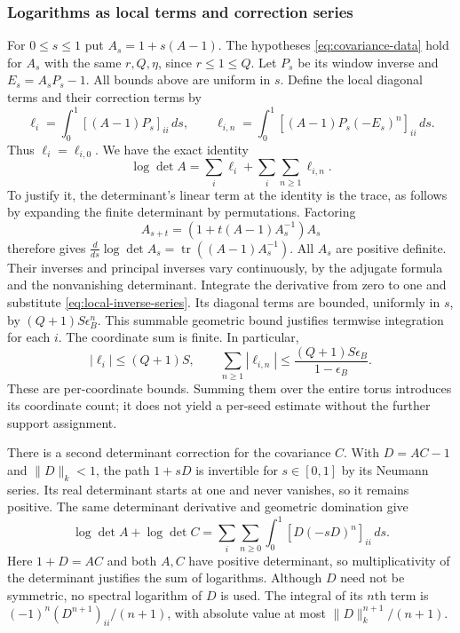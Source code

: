 \subsubsection{Logarithms as local terms and correction series}
For $0\le s\le1$ put $A_s=1+s(A-1)$. The hypotheses
\eqref{eq:covariance-data} hold for $A_s$ with the same
$r,Q,\eta$, since $r\le1\le Q$. Let $P_s$ be its window
inverse and $E_s=A_sP_s-1$. All bounds above are uniform in $s$.
Define the local diagonal terms and their correction terms by
\[
 \ell_i=\int_0^1[(A-1)P_s]_{ii}\,ds,
 \qquad
 \ell_{i,n}=\int_0^1[(A-1)P_s(-E_s)^n]_{ii}\,ds.
\]
Thus $\ell_i=\ell_{i,0}$. We have the exact identity
\begin{equation}\label{eq:local-logdet}
 \log\det A=\sum_i\ell_i+
                   \sum_i\sum_{n\ge1}\ell_{i,n}.
\end{equation}
To justify it, the determinant's linear term at the identity is
the trace, as follows by expanding the finite determinant by
permutations. Factoring
\[
 A_{s+t}=(1+t(A-1)A_s^{-1})A_s
\]
therefore gives
$\frac{d}{ds}\log\det A_s=
\operatorname{tr}((A-1)A_s^{-1})$.
All $A_s$ are positive definite. Their inverses and principal
inverses vary continuously, by the adjugate formula and the
nonvanishing determinant. Integrate the derivative from zero to
one and substitute \eqref{eq:local-inverse-series}. Its diagonal
terms are bounded, uniformly in $s$, by
$(Q+1)S\epsilon_B^n$. This summable geometric bound justifies
termwise integration for each $i$. The coordinate sum is finite.
In particular,
\[
 |\ell_i|\le(Q+1)S,\qquad
 \sum_{n\ge1}|\ell_{i,n}|
 \le\frac{(Q+1)S\epsilon_B}{1-\epsilon_B}.
\]
These are per-coordinate bounds. Summing them over the entire
torus introduces its coordinate count; it does not yield a
per-seed estimate without the further support assignment.

There is a second determinant correction for the covariance $C$.
With $D=AC-1$ and $\|D\|_k<1$, the path $1+sD$ is invertible
for $s\in[0,1]$ by its Neumann series. Its real determinant
starts at one and never vanishes, so it remains positive.
The same determinant derivative and geometric domination give
\begin{equation}\label{eq:covariance-logdet}
 \log\det A+\log\det C
 =\sum_i\sum_{n\ge0}\int_0^1[D(-sD)^n]_{ii}\,ds.
\end{equation}
Here $1+D=AC$ and both $A,C$ have positive determinant, so
multiplicativity of the determinant justifies the sum of logarithms.
Although $D$ need not be symmetric, no spectral logarithm of $D$
is used. The integral of its $n$th term is
$(-1)^n(D^{n+1})_{ii}/(n+1)$, with absolute value at most
$\|D\|_k^{n+1}/(n+1)$.

